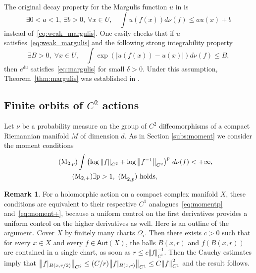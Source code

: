 \documentclass[JEP,XML,SOM,Unicode,published]{cedram}
\newcommand{\norm}[1]{{\left\Vert#1\right\Vert}}
\newcommand{\abs}[1]{\left\vert#1\right\vert}
\newcommand{\rest}[1]{ \arrowvert_{#1}}
\newcommand{\lrpar}[1]{\left(#1\right)}
\newcommand{\inv}{^{-1}}
\newcommand\Aut{\mathsf{Aut}}
\theoremstyle{plain}
\theoremstyle{definition}
\newtheorem{rem}[thm]{Remark}
\begin{document}
The original decay property for the Margulis function $u$ in
\cite{eskin-margulis, benoist-quint3}
is
\begin{equation}
\label{eq:margulis}
\exists 0<a<1, \ \exists b>0, \ \forall x\in U, \quad \int u(f(x))d\nu(f) \leq au(x) +b
\end{equation}
instead of~\eqref{eq:weak_margulis}. One easily checks that if $u$ satisfies~\eqref{eq:weak_margulis} and the following strong integrability property
\begin{equation}
\label{eq:margulis_moment_exp}
\exists B>0,\; \forall x\in U, \quad \int \exp\lrpar{\abs{u(f(x)) - u(x) } }d\nu(f) \leq B,
\end{equation}
then $e^{\delta u}$
satisfies~\eqref{eq:margulis} for small $\delta>0$. Under this assumption, Theorem~\ref{thm:margulis} was established in
\cite{benoist-quint3}.

\subsection{Finite orbits of $C^2$ actions}\label{par:finite-orbits-C2-actions}
Let $\nu$ be a probability measure on the group of $C^2$ diffeomorphisms of a compact Riemannian
manifold $M$ of dimension $d$.
As in Section \ref{subs:moment} we consider the moment conditions
\begin{align}
\label{eq:moment2p}
\tag{M$_{2, p}$}
\int \lrpar{ \log\norm{f}_{C^2 }+ \log\norm{f\inv}_{C^2 }} ^p \, d\nu (f) < + \infty, \\
\label{eq:moment2+}
\tag{M$_{2, +}$}
\exists p>1, \ \mathrm{(M}_{2,p}\mathrm{)} \text{ holds}, \quad \quad \quad\quad \quad \quad \quad\quad
\end{align}
\begin{rem}\label{rem:moment-condition-holo}
For a holomorphic action on a compact
complex manifold $X$, these conditions are equivalent to their respective
$C^1$ analogues~\eqref{eq:momentp} and~\eqref{eq:moment+}, because a uniform control on the first derivatives provides a uniform control on the higher derivatives as well.
Here is an outline of the argument.
Cover $X$ by finitely many charts $\Omega_i$.
Then there exists $c>0$ such that for every $x\in X$ and every $f\in \Aut(X)$, the balls
$B(x,r)$ and $f(B(x,r))$
are contained in a single chart, as soon as $r \leq c \norm{f}_{C^1}\inv$. Then the
Cauchy estimates imply that $\norm{f\rest{B(x, r/2)}}_{C^2}\leq (C/r) \norm{f\rest{B(x, r)}}_{C^1} \leq C \norm{f}_{C^1}^2$ and the result follows.
\end{rem}
\end{document}
